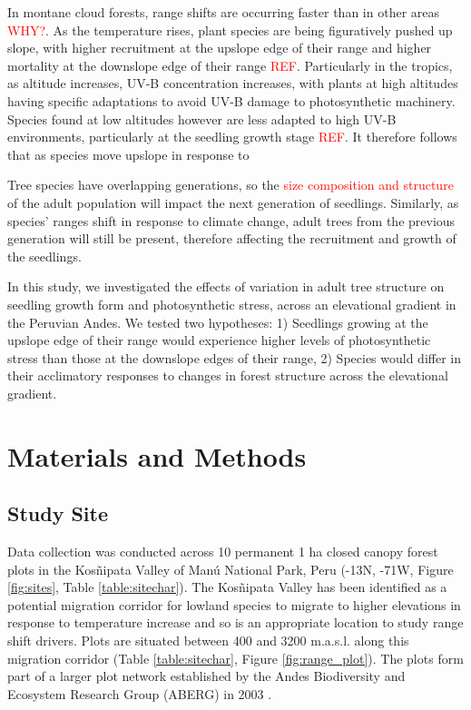 \documentclass[a4paper,11pt]{article}
\newcommand{\todo}[1]{\textcolor{red}{#1}}   %
\begin{document}
In montane cloud forests, range shifts are occurring faster than in other areas \todo{WHY?}. As the temperature rises, plant species are being figuratively pushed up slope, with higher recruitment at the upslope edge of their range and higher mortality at the downslope edge of their range \todo{REF}. Particularly in the tropics, as altitude increases, UV-B concentration increases, with plants at high altitudes having specific adaptations to avoid UV-B damage to photosynthetic machinery. Species found at low altitudes however are less adapted to high UV-B environments, particularly at the seedling growth stage \todo{REF}. It therefore follows that as species move upslope in response to  

Tree species have overlapping generations, so the \todo{size composition and structure} of the adult population will impact the next generation of seedlings. Similarly, as species' ranges shift in response to climate change, adult trees from the previous generation will still be present, therefore affecting the recruitment and growth of the seedlings.

In this study, we investigated the effects of variation in adult tree structure on seedling growth form and photosynthetic stress, across an elevational gradient in the Peruvian Andes. We tested two hypotheses: 1) Seedlings growing at the upslope edge of their range would experience higher levels of photosynthetic stress than those at the downslope edges of their range, 2) Species would differ in their acclimatory responses to changes in forest structure across the elevational gradient. 

\section*{Materials and Methods}
\subsection*{Study Site}
Data collection was conducted across 10 permanent 1 ha closed canopy forest plots in the Kos\~{n}ipata Valley of Man\'{u} National Park, Peru (-13\textdegree N, -71\textdegree W, Figure \ref{fig:sites}, Table \ref{table:sitechar}). The Kos\~{n}ipata Valley has been identified as a potential migration corridor for lowland species to migrate to higher elevations in response to temperature increase \citep{Feeley2011} and so is an appropriate location to study range shift drivers. Plots are situated between 400 and 3200 m.a.s.l. along this migration corridor (Table \ref{table:sitechar}, Figure \ref{fig:range_plot}). The plots form part of a larger plot network established by the Andes Biodiversity and Ecosystem Research Group (ABERG) in 2003 \citep{Malhi2010, Girardin2013a}.
\end{document}
